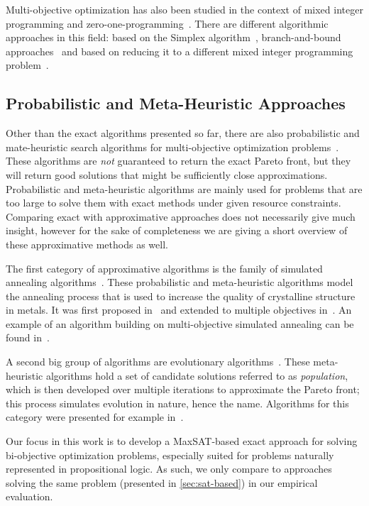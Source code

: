 Multi-objective optimization has also been studied in the context of mixed integer programming and zero-one-programming~\autocites{Ehrgott2005-6,Rasmussen1986,DBLP:journals/eor/AlvesC07}.
There are different algorithmic approaches in this field:
based on the Simplex algorithm~\autocites{Ehrgott2005-7,DBLP:journals/mp/EvansS73}, branch-and-bound approaches~\autocites{Adelgren2021,DBLP:journals/siamjo/SantisENR20} and based on reducing it to a different mixed integer programming problem~\autocites{DBLP:journals/jota/Sun17,DBLP:journals/ol/LuMS20,Soland1979}.

\subsection{Probabilistic and Meta-Heuristic Approaches\label{sec:approximative}}

Other than the exact algorithms presented so far, there are also probabilistic and mate-heuristic search algorithms for multi-objective optimization problems~\autocite{Saini2021}.
These algorithms are \emph{not} guaranteed to return the exact Pareto front, but they will return good solutions that might be sufficiently close approximations.
Probabilistic and meta-heuristic algorithms are mainly used for problems that are too large to solve them with exact methods under given resource constraints.
Comparing exact with approximative approaches does not necessarily give much insight, however for the sake of completeness we are giving a short overview of these approximative methods as well.

The first category of approximative algorithms is the family of simulated annealing algorithms~\autocite{Saini2021}.
These probabilistic and meta-heuristic algorithms model the annealing process that is used to increase the quality of crystalline structure in metals.
It was first proposed in~\textcite{DBLP:journals/science/KirkpatrickGV83} and extended to multiple objectives in~\textcite{DBLP:journals/tec/BandyopadhyaySMD08}.
An example of an algorithm building on multi-objective simulated annealing can be found in~\textcite{DBLP:journals/isci/SenguptaS18}.

A second big group of algorithms are evolutionary algorithms~\autocites{Saini2021,Dasgupta2013}.
These meta-heuristic algorithms hold a set of candidate solutions referred to as \emph{population}, which is then developed over multiple iterations to approximate the Pareto front;
this process simulates evolution in nature, hence the name.
Algorithms for this category were presented for example in~\textcites{DBLP:journals/jgo/StornP97,DBLP:journals/tec/DebAPM02}.

Our focus in this work is to develop a MaxSAT-based exact approach for solving bi-objective optimization problems, especially suited for problems naturally represented in propositional logic.
As such, we only compare to approaches solving the same problem (presented in \cref{sec:sat-based}) in our empirical evaluation.